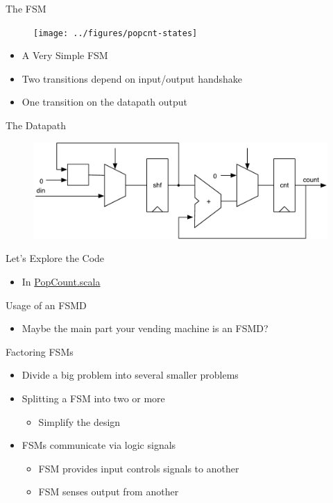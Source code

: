 \begin{frame}[fragile]{The FSM}
\begin{figure}
  \texttt{[image: ../figures/popcnt-states]}
\end{figure}
\begin{itemize}
\item A Very Simple FSM
\item Two transitions depend on input/output handshake
\item One transition on the datapath output
\end{itemize}
\end{frame}

\begin{frame}[fragile]{The Datapath}
\begin{figure}
  \includegraphics[scale=0.65]{../figures/popcnt-data}
\end{figure}
\end{frame}

\begin{frame}[fragile]{Let's Explore the Code}
\begin{itemize}
\item In \href{https://github.com/schoeberl/chisel-book/blob/master/src/main/scala/PopCount.scala}{PopCount.scala}
\end{itemize}
\end{frame}

\begin{frame}[fragile]{Usage of an FSMD}
\begin{itemize}
\item Maybe the main part your vending machine is an FSMD?
\end{itemize}
\end{frame}



\begin{frame}[fragile]{Factoring FSMs}
\begin{itemize}
\item Divide a big problem into several smaller problems
\item Splitting a FSM into two or more
\begin{itemize}
\item Simplify the design
\end{itemize}
\item FSMs communicate via logic signals
\begin{itemize}
\item FSM provides input controls signals to another
\item FSM senses output from another
\end{itemize}
\end{itemize}
\end{frame}

